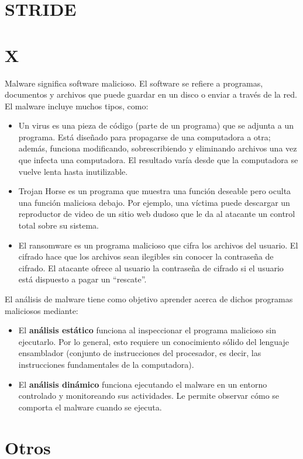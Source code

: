 \section{STRIDE}

\section{X}

Malware significa software malicioso. El software se refiere a programas, documentos y archivos que puede guardar en un disco o enviar a través de la red. El malware incluye muchos tipos, como:
\begin{itemize}
    \item Un virus es una pieza de código (parte de un programa) que se adjunta a un programa. Está diseñado para propagarse de una computadora a otra; además, funciona modificando, sobrescribiendo y eliminando archivos una vez que infecta una computadora. El resultado varía desde que la computadora se vuelve lenta hasta inutilizable.
    \item Trojan Horse es un programa que muestra una función deseable pero oculta una función maliciosa debajo. Por ejemplo, una víctima puede descargar un reproductor de video de un sitio web dudoso que le da al atacante un control total sobre su sistema.
    \item El ransomware es un programa malicioso que cifra los archivos del usuario. El cifrado hace que los archivos sean ilegibles sin conocer la contraseña de cifrado. El atacante ofrece al usuario la contraseña de cifrado si el usuario está dispuesto a pagar un ``rescate''.\end{itemize}

    El análisis de malware tiene como objetivo aprender acerca de dichos programas maliciosos mediante:
\begin{itemize}
    \item El \textbf{análisis estático} funciona al inspeccionar el programa malicioso sin ejecutarlo. Por lo general, esto requiere un conocimiento sólido del lenguaje ensamblador (conjunto de instrucciones del procesador, es decir, las instrucciones fundamentales de la computadora).
    \item El \textbf{análisis dinámico} funciona ejecutando el malware en un entorno controlado y monitoreando sus actividades. Le permite observar cómo se comporta el malware cuando se ejecuta.
\end{itemize}
\section{Otros}
